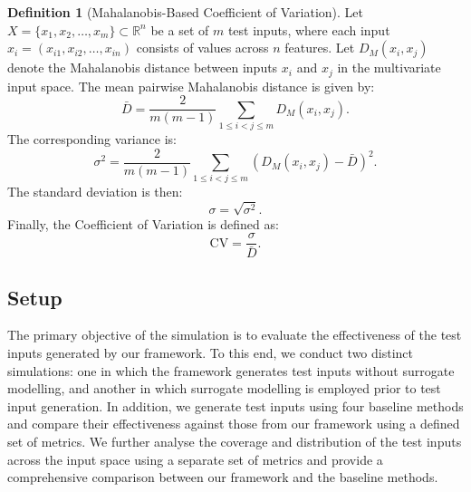 \documentclass[
]{ceurart}
\theoremstyle{definition}
\newtheorem{definition}{Definition}[section]
\begin{document}
\begin{definition}[Mahalanobis-Based Coefficient of Variation]
\label{def:cv}
Let $X = \{x_1, x_2, \dots, x_m\} \subset \mathbb{R}^n$ be a set of $m$ test inputs, where each input $x_i = (x_{i1}, x_{i2}, \dots, x_{in})$ consists of values across $n$ features. Let $D_M(x_i, x_j)$ denote the Mahalanobis distance between inputs $x_i$ and $x_j$ in the multivariate input space.
The mean pairwise Mahalanobis distance is given by:
\begin{equation*}
\bar{D} = \frac{2}{m(m-1)} \sum_{1 \leq i < j \leq m} D_M(x_i, x_j).
\end{equation*}
The corresponding variance is:
\begin{equation*}
\sigma^2 = \frac{2}{m(m-1)} \sum_{1 \leq i < j \leq m} \left( D_M(x_i, x_j) - \bar{D} \right)^2.
\end{equation*}
The standard deviation is then:
\begin{equation*}
\sigma = \sqrt{\sigma^2}.
\end{equation*}
Finally, the Coefficient of Variation is defined as:
\begin{equation*}
\text{CV} = \frac{\sigma}{\bar{D}}.
\end{equation*}
\end{definition}

\subsection{Setup}
\label{sec:setup}

The primary objective of the simulation is to evaluate the effectiveness of the test inputs generated by our framework. To this end, we conduct two distinct simulations: one in which the framework generates test inputs without surrogate modelling, and another in which surrogate modelling is employed prior to test input generation. In addition, we generate test inputs using four baseline methods and compare their effectiveness against those from our framework using a defined set of metrics. We further analyse the coverage and distribution of the test inputs across the input space using a separate set of metrics and provide a comprehensive comparison between our framework and the baseline methods.
\end{document}
